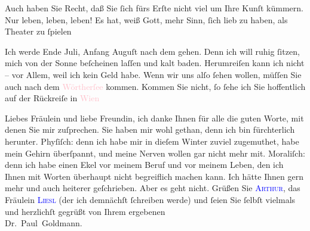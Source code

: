 \pstart
           Auch haben Sie Recht, daß Sie ſich fürs Erſte nicht viel um Ihre Kunſt kümmern. Nur
               leben, leben, leben! Es hat, weiß Gott, mehr Sinn, ſich lieb zu haben, als Theater zu
                  ſpielen{\dotsfive}\pend
           
\pstart
           Ich werde Ende Juli, Anfang Auguſt nach dem \label{K_L03528-2v}\label{K_L03528-2h}{ }{\pb}gehen. Denn ich will ruhig ſitzen, mich von der
               Sonne beſcheinen laſſen und kalt baden. Herumreiſen kann ich nicht – vor Allem, weil
               ich kein Geld habe. Wenn wir uns alſo ſehen wollen, müſſen Sie auch nach dem \textcolor{pink}{Wörtherſee}{}\ledrightnote{\textcolor{pink}{Wörthersee}} kommen. Kommen Sie nicht, ſo ſehe ich
               Sie hoffentlich auf der Rückreiſe in \textcolor{pink}{Wien}{}\ledrightnote{\textcolor{pink}{Wien}}{\dotsfive}\pend
           
\pstart
           Liebes Fräulein und liebe Freundin, ich danke Ihnen für alle die guten Worte, mit
               denen Sie mir zuſprechen. Sie haben mir wohl gethan, denn ich bin fürchterlich
               herunter. {\pb}Phyſiſch: denn ich habe mir in dieſem
               Winter zuviel zugemuthet, habe mein Gehirn überſpannt, und meine Nerven wollen gar
               nicht mehr mit. Moraliſch: denn ich habe einen Ekel vor meinem Beruf und vor meinem
               Leben, den ich Ihnen mit Worten überhaupt nicht begreiflich machen kann. Ich hätte
               Ihnen gern mehr und auch heiterer geſchrieben. Aber es geht nicht. Grüßen Sie \textsc{\textcolor{blue}{Arthur}{}\ledrightnote{}}, das Fräulein \textsc{\textcolor{blue}{Liesl}{}\ledrightnote{\textcolor{blue}{Elisabeth Steinrück}}} (der ich demnächſt ſchreiben werde) und ſeien Sie ſelbſt vielmals und
               herzlichſt gegrüßt von Ihrem ergebenen {\\}\spacefill\mbox{Dr. Paul Goldmann.}\pend
           \endnumbering{}  
      